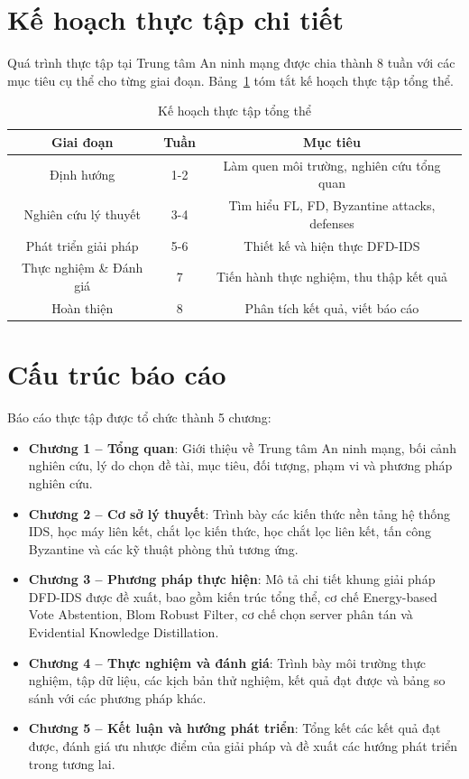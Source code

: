 \section{Kế hoạch thực tập chi tiết}
\label{sec:plan}

Quá trình thực tập tại Trung tâm An ninh mạng được chia thành 8 tuần với các mục tiêu cụ thể cho từng giai đoạn. Bảng~\ref{tab:plan_summary} tóm tắt kế hoạch thực tập tổng thể.

\begin{table}[H]
\centering
\caption{Kế hoạch thực tập tổng thể}
\label{tab:plan_summary}
\begin{tabular}{|c|c|c|}
\hline
\textbf{Giai đoạn} & \textbf{Tuần} & \textbf{Mục tiêu} \\
\hline
Định hướng & 1-2 & Làm quen môi trường, nghiên cứu tổng quan \\
\hline
Nghiên cứu lý thuyết & 3-4 & Tìm hiểu FL, FD, Byzantine attacks, defenses \\
\hline
Phát triển giải pháp & 5-6 & Thiết kế và hiện thực DFD-IDS \\
\hline
Thực nghiệm \& Đánh giá & 7 & Tiến hành thực nghiệm, thu thập kết quả \\
\hline
Hoàn thiện & 8 & Phân tích kết quả, viết báo cáo \\
\hline
\end{tabular}
\end{table}

\section{Cấu trúc báo cáo}
\label{sec:structure}

Báo cáo thực tập được tổ chức thành 5 chương:

\begin{itemize}
    \item \textbf{Chương 1 -- Tổng quan}: Giới thiệu về Trung tâm An ninh mạng, bối cảnh nghiên cứu, lý do chọn đề tài, mục tiêu, đối tượng, phạm vi và phương pháp nghiên cứu.
    \item \textbf{Chương 2 -- Cơ sở lý thuyết}: Trình bày các kiến thức nền tảng hệ thống IDS, học máy liên kết, chắt lọc kiến thức, học chắt lọc liên kết, tấn công Byzantine và các kỹ thuật phòng thủ tương ứng.
    \item \textbf{Chương 3 -- Phương pháp thực hiện}: Mô tả chi tiết khung giải pháp DFD-IDS được đề xuất, bao gồm kiến trúc tổng thể, cơ chế Energy-based Vote Abstention, Blom Robust Filter, cơ chế chọn server phân tán và Evidential Knowledge Distillation.
    \item \textbf{Chương 4 -- Thực nghiệm và đánh giá}: Trình bày môi trường thực nghiệm, tập dữ liệu, các kịch bản thử nghiệm, kết quả đạt được và bảng so sánh với các phương pháp khác.
    \item \textbf{Chương 5 -- Kết luận và hướng phát triển}: Tổng kết các kết quả đạt được, đánh giá ưu nhược điểm của giải pháp và đề xuất các hướng phát triển trong tương lai.
\end{itemize}

\pagebreak
